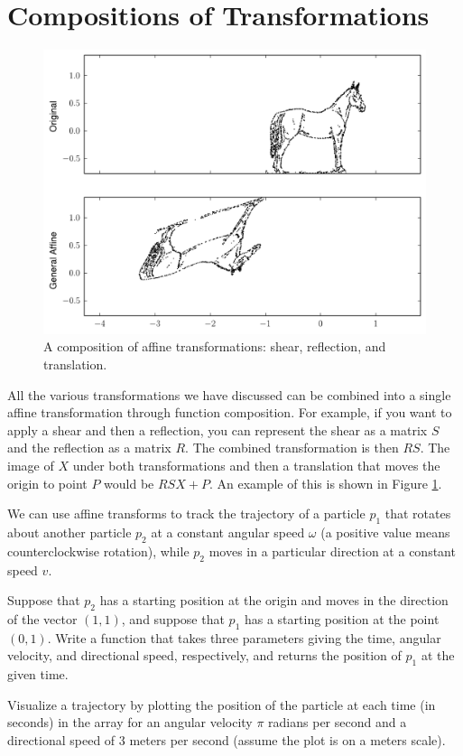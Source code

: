 \section*{Compositions of Transformations}

\begin{figure}
\centering
\includegraphics[width=\textwidth]{combo.pdf}
\caption{
A composition of affine transformations: shear, reflection, and translation.}
\label{basis:combo}
\end{figure}

All the various transformations we have discussed can be combined into a single affine transformation through function composition.
For example, if you want to apply a shear and then a reflection, you can represent the shear as a matrix $S$ and the reflection as a matrix $R$. The combined transformation is then $RS$. The image of $X$ under both transformations and then a translation that moves the origin to point $P$ would be $RSX+P$. An example of this is shown in Figure \ref{basis:combo}.

\begin{problem}
We can use affine transforms to track the trajectory of a particle $p_1$ that rotates about another particle $p_2$ at a constant angular speed $\omega$ (a positive value means counterclockwise rotation), while $p_2$ moves in a particular direction at a constant speed $v$. 

Suppose that $p_2$ has a starting position at the origin and moves in the direction of the vector $(1, 1)$, and suppose that $p_1$ has a starting position at the point $(0,1)$. Write a function that takes three parameters giving the time, angular velocity, and directional speed, respectively, and returns the position of $p_1$ at the given  time.

Visualize a trajectory by plotting the position of the particle at each time (in seconds) in the array  for an angular velocity $\pi$ radians per second and a directional speed of 3 meters per second (assume the plot is on a meters scale).
\end{problem}

